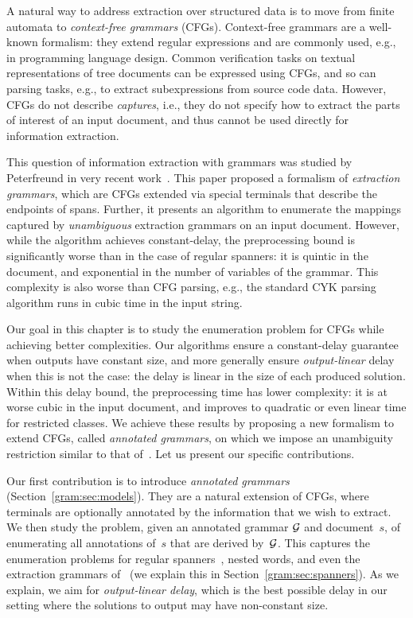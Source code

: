 
A natural way to address extraction over structured data is to move from finite automata to \emph{context-free grammars}
(CFGs). Context-free grammars are a well-known formalism: they extend regular
expressions and are commonly used, e.g., in programming language
design. Common verification tasks on textual representations of tree
documents can be expressed using CFGs, and so can parsing tasks, e.g.,
to extract subexpressions from source code data. However, CFGs do not
describe \emph{captures}, i.e., they do not specify how to extract the
parts of interest of an input document, and thus cannot be used
directly for information extraction.

%
%

This question of information extraction with grammars was studied by Peterfreund in very recent work~\cite{Peterfreund21}. This paper proposed a formalism of \emph{extraction grammars}, which are CFGs extended via special terminals that describe the endpoints of spans.
Further, it presents an algorithm to enumerate the mappings captured by
\emph{unambiguous} extraction grammars on an input document.
However, while the algorithm achieves constant-delay, the preprocessing bound is significantly worse than in the case of regular spanners: it is quintic in the document, and exponential in the number of variables of the grammar. This complexity is also worse than CFG parsing, e.g., the standard CYK parsing algorithm runs in cubic time in the input string.

%
%
%

Our goal in this chapter is to study the enumeration problem for CFGs while
achieving better complexities. Our algorithms ensure a constant-delay
guarantee when outputs have constant size, and more generally ensure
\emph{output-linear} delay when this is not the case: the delay is linear in the
size of each produced solution. Within this delay bound, the preprocessing
time has lower complexity: it is at worse cubic in the
input document, and improves to quadratic or even linear time for restricted
classes. We achieve these results by proposing a new formalism to extend CFGs, called
\emph{annotated grammars}, on which we impose an unambiguity restriction similar
to that of~\cite{Peterfreund21}. Let us present our specific contributions.

Our first contribution is to introduce \emph{annotated grammars} (Section~\ref{gram:sec:models}).
They are a natural extension of CFGs, where terminals are optionally annotated by the information that we wish to extract.
We then study the problem, given an annotated grammar $\mathcal{G}$ and document~$s$, of
enumerating all annotations of~$s$ that are derived by~$\mathcal{G}$.
This captures the enumeration problems for regular spanners~\cite{FlorenzanoRUVV18,amarilli2020constant}, nested words,
and
even the extraction grammars of~\cite{Peterfreund21} (we explain this in Section~\ref{gram:sec:spanners}). 
%
%
As we explain, we aim for \emph{output-linear delay}, which is the best
possible delay in our setting where the solutions to output may have
non-constant size. 

